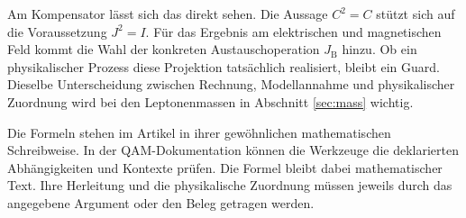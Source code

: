Am Kompensator lässt sich das direkt sehen. Die Aussage \(C^2=C\) stützt sich auf die Voraussetzung \(J^2=I\). Für das Ergebnis am elektrischen und magnetischen Feld kommt die Wahl der konkreten Austauschoperation \(J_{\mathrm B}\) hinzu. Ob ein physikalischer Prozess diese Projektion tatsächlich realisiert, bleibt ein Guard. Dieselbe Unterscheidung zwischen Rechnung, Modellannahme und physikalischer Zuordnung wird bei den Leptonenmassen in Abschnitt \ref{sec:mass} wichtig.

Die Formeln stehen im Artikel in ihrer gewöhnlichen mathematischen Schreibweise. In der QAM-Dokumentation können die Werkzeuge die deklarierten Abhängigkeiten und Kontexte prüfen. Die Formel bleibt dabei mathematischer Text. Ihre Herleitung und die physikalische Zuordnung müssen jeweils durch das angegebene Argument oder den Beleg getragen werden.
